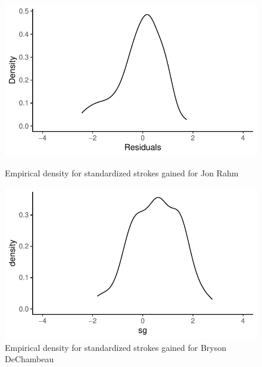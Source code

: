 \documentclass{article}\usepackage[]{graphicx}\usepackage[]{color}
\begin{document}
\begin{figure}[h]
\begin{minipage}{0.475\textwidth}
    \centering
    \includegraphics[width=1\textwidth]{Figures/rahm_empirical_density.pdf}
    \caption{Empirical density for standardized strokes gained for Jon Rahm}
    \label{fig:rahm_empirical_density}
\end{minipage}
\hspace{0.05\textwidth}
\begin{minipage}{0.475\textwidth}
    \centering
    \includegraphics[width=1\textwidth]{Figures/empirical_density_dechambeau.pdf}
    \caption{Empirical density for standardized strokes gained for Bryson DeChambeau}
    \label{fig:dechambeau_empirical_density}
\end{minipage}
\end{figure}
\newpage
\end{document}
